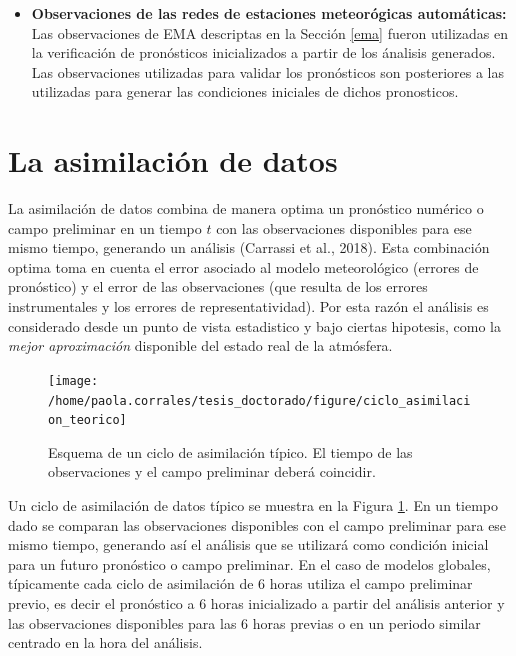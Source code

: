 \documentclass[12pt,oneside,a4paper]{reedthesis}
\begin{document}
\begin{itemize}
\item
  \textbf{Observaciones de las redes de estaciones meteorógicas automáticas:} Las observaciones de EMA descriptas en la Sección \ref{ema} fueron utilizadas en la verificación de pronósticos inicializados a partir de los ánalisis generados. Las observaciones utilizadas para validar los pronósticos son posteriores a las utilizadas para generar las condiciones iniciales de dichos pronosticos.
\end{itemize}
\hypertarget{la-asimilaciuxf3n-de-datos}{%
\section{La asimilación de datos}\label{la-asimilaciuxf3n-de-datos}}

La asimilación de datos combina de manera optima un pronóstico numérico o campo preliminar en un tiempo \(t\) con las observaciones disponibles para ese mismo tiempo, generando un análisis (Carrassi et al., 2018). Esta combinación optima toma en cuenta el error asociado al modelo meteorológico (errores de pronóstico) y el error de las observaciones (que resulta de los errores instrumentales y los errores de representatividad). Por esta razón el análisis es considerado desde un punto de vista estadistico y bajo ciertas hipotesis, como la \emph{mejor aproximación} disponible del estado real de la atmósfera.


\begin{figure}

{\centering \texttt{[image: /home/paola.corrales/tesis\_doctorado/figure/ciclo\_asimilacion\_teorico]} 

}

\caption{Esquema de un ciclo de asimilación típico. El tiempo de las observaciones y el campo preliminar deberá coincidir.}\label{fig:ciclo-asimilacion-teorico}
\end{figure}
Un ciclo de asimilación de datos típico se muestra en la Figura \ref{fig:ciclo-asimilacion-teorico}. En un tiempo dado se comparan las observaciones disponibles con el campo preliminar para ese mismo tiempo, generando así el análisis que se utilizará como condición inicial para un futuro pronóstico o campo preliminar. En el caso de modelos globales, típicamente cada ciclo de asimilación de 6 horas utiliza el campo preliminar previo, es decir el pronóstico a 6 horas inicializado a partir del análisis anterior y las observaciones disponibles para las 6 horas previas o en un periodo similar centrado en la hora del análisis.
\end{document}
